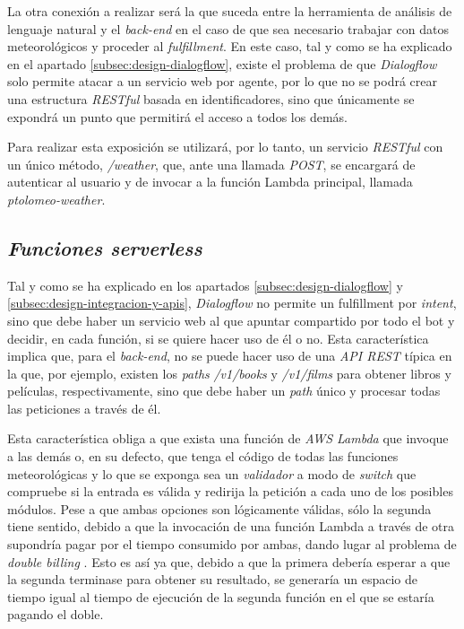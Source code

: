 \documentclass[11pt,spanish,listoffigures]{tfgetsinf}
\begin{document}
La otra conexión a realizar será la que suceda entre la herramienta de análisis de lenguaje natural y el \textit{back-end} en el caso de que sea necesario trabajar con datos meteorológicos y proceder al \textit{fulfillment}. En este caso, tal y como se ha explicado en el apartado \ref{subsec:design-dialogflow}, existe el problema de que \textit{Dialogflow} solo permite atacar a un servicio web por agente, por lo que no se podrá crear una estructura \textit{RESTful} basada en identificadores, sino que únicamente se expondrá un punto que permitirá el acceso a todos los demás.

Para realizar esta exposición se utilizará, por lo tanto, un servicio \textit{RESTful} con un único método, \textit{/weather}, que, ante una llamada \textit{POST}, se encargará de autenticar al usuario y de invocar a la función Lambda principal, llamada \textit{ptolomeo-weather}.

\subsection{\textit{Funciones \textit{serverless}}}
\label{subsec:design-funciones serverless}

Tal y como se ha explicado en los apartados \ref{subsec:design-dialogflow} y \ref{subsec:design-integracion-y-apis}, \textit{Dialogflow} no permite un fulfillment por \textit{intent}, sino que debe haber un servicio web al que apuntar compartido por todo el bot y decidir, en cada función, si se quiere hacer uso de él o no. Esta característica implica que, para el \textit{back-end}, no se puede hacer uso de una \textit{API REST} típica en la que, por ejemplo, existen los \textit{paths} \textit{/v1/books} y \textit{/v1/films} para obtener libros y películas, respectivamente, sino que debe haber un \textit{path} único y procesar todas las peticiones a través de él.

Esta característica obliga a que exista una función de \textit{AWS Lambda} que invoque a las demás o, en su defecto, que tenga el código de todas las funciones meteorológicas y lo que se exponga sea un \textit{validador} a modo de \textit{switch} que compruebe si la entrada es válida y redirija la petición a cada uno de los posibles módulos. Pese a que ambas opciones son lógicamente válidas, sólo la segunda tiene sentido, debido a que la invocación de una función Lambda a través de otra supondría pagar por el tiempo consumido por ambas, dando lugar al problema de \textit{double billing} \cite{double-billing}. Esto es así ya que, debido a que la primera debería esperar a que la segunda terminase para obtener su resultado, se generaría un espacio de tiempo igual al tiempo de ejecución de la segunda función en el que se estaría pagando el doble. 
\end{document}
